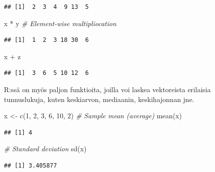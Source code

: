 \documentclass[
]{book}
\newenvironment{Shaded}{\begin{snugshade}}{\end{snugshade}}
\newcommand{\CommentTok}[1]{\textcolor[rgb]{0.56,0.35,0.01}{\textit{#1}}}
\newcommand{\DecValTok}[1]{\textcolor[rgb]{0.00,0.00,0.81}{#1}}
\newcommand{\FunctionTok}[1]{\textcolor[rgb]{0.00,0.00,0.00}{#1}}
\newcommand{\NormalTok}[1]{#1}
\newcommand{\OtherTok}[1]{\textcolor[rgb]{0.56,0.35,0.01}{#1}}
\newcommand{\SpecialCharTok}[1]{\textcolor[rgb]{0.00,0.00,0.00}{#1}}
\begin{document}
\begin{verbatim}
## [1]  2  3  4  9 13  5
\end{verbatim}

\begin{Shaded}
\begin{Highlighting}[]
\NormalTok{x }\SpecialCharTok{*}\NormalTok{ y }\CommentTok{\# Element{-}wise multipliocation}
\end{Highlighting}
\end{Shaded}

\begin{verbatim}
## [1]  1  2  3 18 30  6
\end{verbatim}

\begin{Shaded}
\begin{Highlighting}[]
\NormalTok{x }\SpecialCharTok{+}\NormalTok{ z}
\end{Highlighting}
\end{Shaded}

\begin{verbatim}
## [1]  3  6  5 10 12  6
\end{verbatim}

R:ssä on myös paljon funktioita, joilla voi laskea vektoreista erilaisia tunnuslukuja, kuten keskiarvon, mediaanin, keskihajonnan jne.

\begin{Shaded}
\begin{Highlighting}[]
\NormalTok{x }\OtherTok{\textless{}{-}} \FunctionTok{c}\NormalTok{(}\DecValTok{1}\NormalTok{, }\DecValTok{2}\NormalTok{, }\DecValTok{3}\NormalTok{, }\DecValTok{6}\NormalTok{, }\DecValTok{10}\NormalTok{, }\DecValTok{2}\NormalTok{)}
\CommentTok{\# Sample mean (average)}
\FunctionTok{mean}\NormalTok{(x)}
\end{Highlighting}
\end{Shaded}

\begin{verbatim}
## [1] 4
\end{verbatim}

\begin{Shaded}
\begin{Highlighting}[]
\CommentTok{\# Standard deviation}
\FunctionTok{sd}\NormalTok{(x)}
\end{Highlighting}
\end{Shaded}

\begin{verbatim}
## [1] 3.405877
\end{verbatim}
\end{document}
